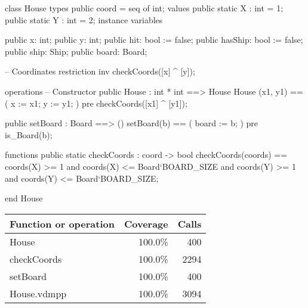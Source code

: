 \begin{vdm_al}
class House
 types
  public coord = seq of int;
 values
  public static X : int = 1;
  public static Y : int = 2;
 instance variables
 
 public x: int;
 public y: int;
 public hit: bool := false;
 public hasShip: bool := false;
 public ship: Ship;
 public board: Board;

 -- Coordinates restriction 
 inv checkCoords([x] ^ [y]);
 
 operations
  -- Constructor
  public House : int * int ==> House
   House (x1, y1) ==
   (
    x := x1;
    y := y1;
   )
  pre checkCoords([x1] ^ [y1]);
  
  public setBoard : Board ==> ()
   setBoard(b) ==
   (
    board := b;
   )
  pre is_Board(b);
 
 functions
  public static checkCoords : coord -> bool
   checkCoords(coords) ==
    coords(X) >= 1 and coords(X) <= Board`BOARD_SIZE and
    coords(Y) >= 1 and coords(Y) <= Board`BOARD_SIZE;
 
end House
\end{vdm_al}
\bigskip
\begin{longtable}{|l|r|r|}
\hline
Function or operation & Coverage & Calls \\
\hline
\hline
House & 100.0\% & 400 \\
\hline
checkCoords & 100.0\% & 2294 \\
\hline
setBoard & 100.0\% & 400 \\
\hline
\hline
House.vdmpp & 100.0\% & 3094 \\
\hline
\end{longtable}

